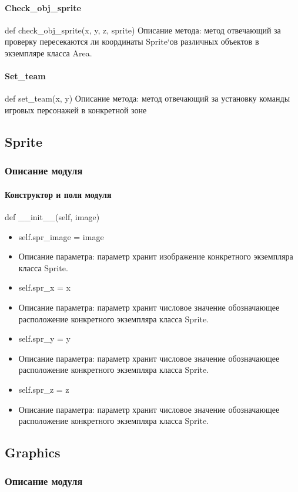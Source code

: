 \paragraph{Check\_obj\_sprite}
def check\_obj\_sprite(x, y, z, sprite)
Описание метода: метод отвечающий за проверку пересекаются ли координаты Sprite`ов различных объектов в экземпляре класса Area.
\paragraph{Set\_team}
def set\_team(x, y)
Описание метода: метод отвечающий за установку команды игровых персонажей в конкретной зоне

\subsection{Sprite}
\subsubsection{Описание модуля}
\paragraph{Конструктор и поля модуля}
def \_\_init\_\_(self, image)
\begin{itemize}
	\item self.spr\_image = image
	\item Описание параметра: параметр хранит изображение конкретного экземпляра класса Sprite.
	\item self.spr\_x = x
	\item Описание параметра: параметр хранит числовое значение обозначающее расположение конкретного экземпляра класса Sprite.
	\item self.spr\_y = y
	\item Описание параметра: параметр хранит числовое значение обозначающее расположение конкретного экземпляра класса Sprite.
	\item self.spr\_z = z
	\item Описание параметра: параметр хранит числовое значение обозначающее расположение конкретного экземпляра класса Sprite.
\end{itemize}

\subsection{Graphics}
\subsubsection{Описание модуля}
